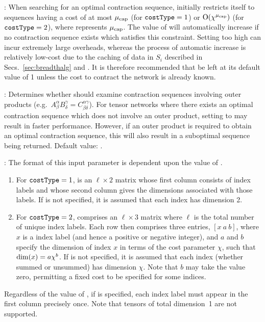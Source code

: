 : When searching for an optimal contraction sequence,  initially restricts itself to sequences having a cost of at most ${\mu_{\mathrm{cap}}}$ (for $\texttt{costType}=1$) or $\mathrm{O}(\chi^{\mu_{\mathrm{cap}}})$ (for $\texttt{costType}=2$), where  represents ${\mu_{\mathrm{cap}}}$. The value of  will automatically increase if no contraction sequence exists which satisfies this constraint. Setting  too high can incur extremely large overheads, whereas the process of automatic increase is relatively low-cost due to the caching of data in $S_i$ described in Secs.~\ref{sec:breadthalg} and . It is therefore recommended that  be left at its default value of 1 unless the cost to contract the network is already known.

: Determines whether  should examine contraction sequences involving outer products (e.g.~$A^\alpha_\beta B^\gamma_\delta=C^{\alpha\gamma}_{\beta\delta}$). For tensor networks where there exists an optimal contraction sequence which does not involve an outer product, setting  to  may result in faster performance. However, if an outer product is required to obtain an optimal contraction sequence, this will also result in a suboptimal sequence being returned. Default value: .



: The format of this input parameter is dependent upon the value of .
\begin{enumerate}
\item For $\texttt{costType}=1$,  is an $\ell\times 2$ matrix whose first column consists of index labels and whose second column gives the dimensions associated with those labels. If  is not specified, it is assumed that each index has dimension 2. 
\item For $\texttt{costType}=2$,  comprises an $\ell\times 3$ matrix where $\ell$ is the total number of unique index labels. Each row then comprises three entries, $[x~a~b]$, where $x$ is a index label (and hence a positive or negative integer), and $a$ and $b$ specify the dimension of index $x$ in terms of the cost parameter $\chi$, such that $\mathrm{dim}(x)=a\chi^b$. If  is not specified, it is assumed that each index (whether summed or unsummed) has dimension $\chi$. Note that $b$ may take the value zero, permitting a fixed cost to be specified for some indices. 
\end{enumerate}
Regardless of the value of , if  is specified, each index label must appear in the first column precisely once. Note that tensors of total dimension~1 are not supported.




